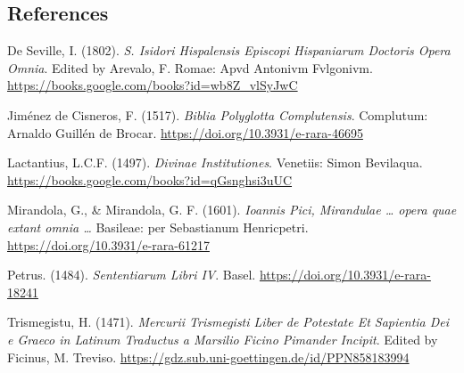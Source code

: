 \documentclass[
]{article}
\begin{document}
\hypertarget{references}{%
\subsection{References}\label{references}}

De Seville, I. (1802). \emph{S. Isidori Hispalensis Episcopi Hispaniarum
Doctoris Opera Omnia}. Edited by Arevalo, F. Romae: Apvd Antonivm
Fvlgonivm. \url{https://books.google.com/books?id=wb8Z_vlSyJwC}

Jiménez de Cisneros, F. (1517). \emph{Biblia Polyglotta Complutensis}.
Complutum: Arnaldo Guillén de Brocar.
\url{https://doi.org/10.3931/e-rara-46695}

Lactantius, L.C.F. (1497). \emph{Divinae Institutiones}. Venetiis: Simon
Bevilaqua. \url{https://books.google.com/books?id=qGsnghsi3uUC}

Mirandola, G., \& Mirandola, G. F. (1601). \emph{Ioannis Pici,
Mirandulae \ldots{} opera quae extant omnia \ldots{}} Basileae: per
Sebastianum Henricpetri. \url{https://doi.org/10.3931/e-rara-61217}

Petrus. (1484). \emph{Sententiarum Libri IV}. Basel.
\url{https://doi.org/10.3931/e-rara-18241}

Trismegistu, H. (1471). \emph{Mercurii Trismegisti Liber de Potestate Et
Sapientia Dei e Graeco in Latinum Traductus a Marsilio Ficino Pimander
Incipit}. Edited by Ficinus, M. Treviso.
\url{https://gdz.sub.uni-goettingen.de/id/PPN858183994}
\end{document}
